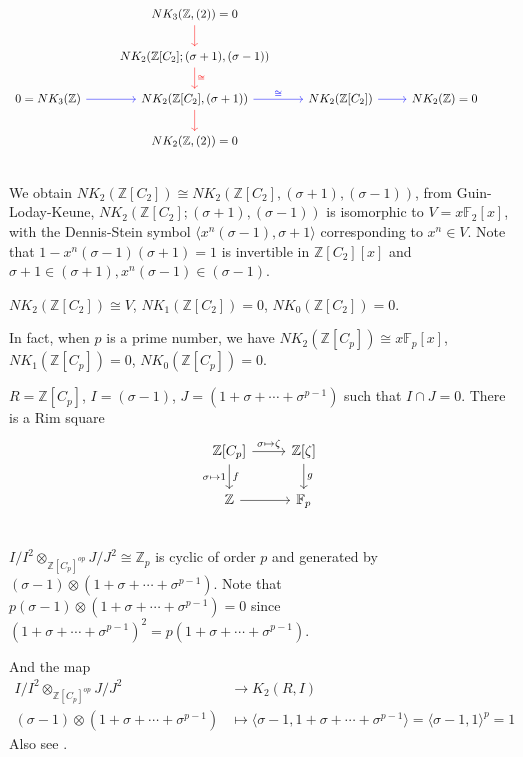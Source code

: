 {\[\begin{tikzcd}
	 & NK_3(\mathbb{Z},(2))=0 \ar[d,red] & & & \\
	 & NK_2(\mathbb{Z}[C_2];(\sigma+1),(\sigma-1)) \ar[d,red,"\cong",red] \\
0=NK_3(\mathbb{Z})	\ar[r,blue] & NK_2(\mathbb{Z}[C_2],(\sigma+1)) \ar[r,blue,"\cong",blue] \ar[d,red] & NK_2(\mathbb{Z}[C_2]) \ar[r,blue] &NK_2(\mathbb{Z})=0\\
	& NK_2(\mathbb{Z},(2))=0 \\
\end{tikzcd}
\]
We obtain $NK_2(\mathbb{Z}[C_2])\cong NK_2(\mathbb{Z}[C_2],(\sigma+1),(\sigma-1))$, from Guin-Loday-Keune\cite{Guin-Waléry1981}, $NK_2(\mathbb{Z}[C_2];(\sigma+1),(\sigma-1))$ is isomorphic to $V=x \mathbb{F}_2[x]$, with the Dennis-Stein symbol $\langle x^n(\sigma-1),\sigma+1 \rangle$ corresponding to $x^n\in V$. Note that $1-x^n(\sigma-1)(\sigma+1)=1$ is invertible in $\mathbb{Z}[C_2][x]$ and $\sigma+1 \in (\sigma+1), x^n(\sigma-1) \in (\sigma-1)$.

\begin{theorem}
	$NK_2(\mathbb{Z}[C_2])\cong V$, $NK_1(\mathbb{Z}[C_2])=0$, $NK_0(\mathbb{Z}[C_2])=0$.
\end{theorem}

In fact, when $p$ is a prime number, we have $NK_2(\mathbb{Z}[C_p])\cong x \mathbb{F}_p[x]$, $NK_1(\mathbb{Z}[C_p])=0$, $NK_0(\mathbb{Z}[C_p])=0$.

\begin{example}[{$\mathbb{Z}[C_p]$}]
	$R=\mathbb{Z}[C_p]$, $I=(\sigma-1)$, $J=(1+\sigma+\cdots+\sigma^{p-1})$ such that $I\cap J =0$. There is a Rim square
		\[\begin{tikzcd}
			\mathbb{Z}[C_p] \ar[r,"\sigma \mapsto \zeta"] \ar[d,"f","\sigma\mapsto 1"']& \mathbb{Z}[\zeta]\ar[d,"g"]\\
			\mathbb{Z} \ar[r] & \mathbb{F}_p\\
		\end{tikzcd}\]
$I/I^2\otimes_{\mathbb{Z}[C_p]^{op}}J/J^2 \cong \mathbb{Z}_p$ is cyclic of order $p$ and generated by $(\sigma-1)\otimes(1+\sigma+\cdots+\sigma^{p-1})$. Note that $p(\sigma-1)\otimes(1+\sigma+\cdots+\sigma^{p-1})=0$ since $(1+\sigma+\cdots+\sigma^{p-1})^2=p(1+\sigma+\cdots+\sigma^{p-1})$.

And the map 
\begin{align*}
I/I^2\otimes_{\mathbb{Z}[C_p]^{op}}J/J^2 &\longrightarrow K_2(R,I)\\
(\sigma-1)\otimes(1+\sigma+\cdots+\sigma^{p-1}) & \mapsto \langle \sigma-1,1+\sigma+\cdots+\sigma^{p-1} \rangle =\langle \sigma-1,1\rangle^p=1
\end{align*}
Also see \cite{STEIN1980213}.


\end{example}}
